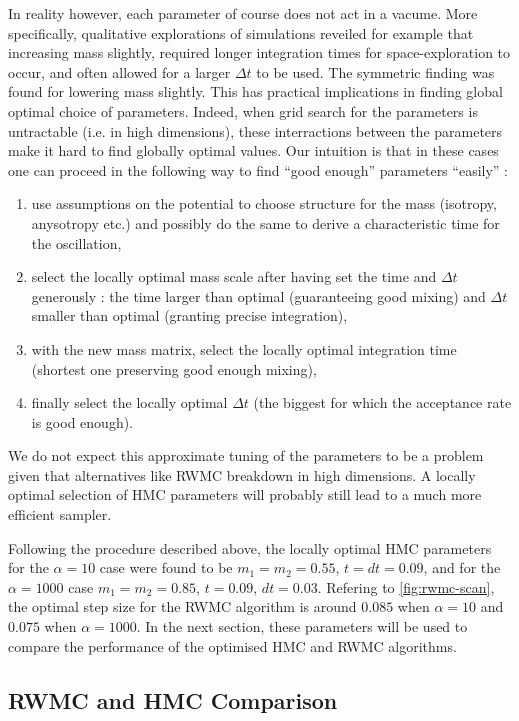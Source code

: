 \documentclass[a4paper, 12pt,oneside]{article}
\begin{document}
			In reality however, each parameter of course does not act in a vacume. More specifically, qualitative explorations of simulations reveiled for example that increasing mass slightly, required longer integration times for space-exploration to occur, and often allowed for a larger $\Delta t$ to be used. The symmetric finding was found for lowering mass slightly. This has practical implications in finding global optimal choice of parameters. Indeed, when grid search for the parameters is untractable (i.e. in high dimensions), these interractions between the parameters make it hard to find globally optimal values. Our intuition is that in these cases one can proceed in the following way to find ``good enough'' parameters ``easily'' : 
			\begin{enumerate}
				\item use assumptions on the potential to choose structure for the mass (isotropy, anysotropy etc.) and possibly do the same to derive a characteristic time for the oscillation,
				\item select the locally optimal mass scale after having set  the time and $\Delta t$ generously : the time larger than optimal (guaranteeing good mixing) and $\Delta t$ smaller than optimal (granting precise integration),
				\item with the new mass matrix, select the locally optimal integration time (shortest one preserving good enough mixing),
				\item finally select the locally optimal $\Delta t$ (the biggest for which the acceptance rate is good enough).
			\end{enumerate}
			We do not expect this approximate tuning of the parameters to be a problem given that alternatives like RWMC breakdown in high dimensions. A locally optimal selection of HMC parameters will probably still lead to a much more efficient sampler.

			Following the procedure described above, the locally optimal  HMC parameters for the $\alpha=10$ case were found to be $m_1=m_2=0.55$, $t=dt=0.09$, and for the $\alpha=1000$ case $m_1=m_2=0.85$, $t=0.09$, $dt=0.03$. Refering to \ref{fig:rwmc-scan}, the optimal step size for the RWMC algorithm is around $0.085$ when $\alpha=10$ and $0.075$ when $\alpha=1000$. In the next section, these parameters will be used to compare the performance of the optimised HMC and RWMC algorithms.
		\subsection{RWMC and HMC Comparison}
\end{document}
